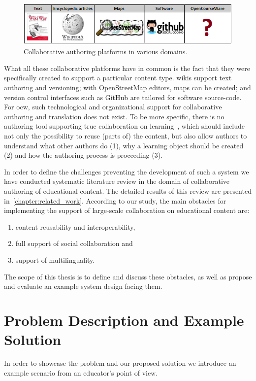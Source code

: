 \documentclass[PhD, Submit, ngerman,UKenglish,table]{scrbook}
\begin{document}
\begin{figure}
\centering
\includegraphics[scale=1]{images/empty_spot.png}
\caption{Collaborative authoring platforms in various domains.}
\label{fig:SlideWiki_place}
\end{figure}

What all these collaborative platforms have in common is the fact that they were specifically created to support a particular content type.
wikis support text authoring and versioning; with OpenStreetMap editors, maps can be created; and version control interfaces such as GitHub are tailored for software source-code.
For \gls{ocw}, such technological and organizational support for collaborative authoring and translation does not exist.
To be more specific, there is no authoring tool supporting true collaboration on learning~\cite{Nurjanah2011}, which should include not only the possibility to reuse (parts of) the content, but also allow authors to understand what other authors do (1), why a learning object should be created (2) and how the authoring process is proceeding (3). 

In order to define the challenges preventing the development of such a system we have conducted systematic literature review in the domain of collaborative authoring of educational content.
The detailed results of this review are presented in~\autoref{chapter:related_work}.
According to our study, the main obstacles for implementing the support of large-scale collaboration on educational content are: 
\begin{enumerate}
\item content reusability and interoperability,
\item full support of social collaboration and
\item support of multilinguality.
\end{enumerate}
The scope of this thesis is to define and discuss these obstacles, as well as propose and evaluate an example system design facing them.

\section{Problem Description and Example Solution}  
In order to showcase the problem and our proposed solution we introduce an example  scenario from an educator's point of view.
\end{document}

